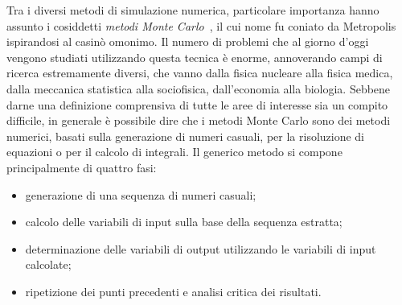 Tra i diversi metodi di simulazione numerica, particolare importanza hanno assunto i cosiddetti \emph{metodi Monte Carlo}~\cite{metropolis:jasa49}, il cui nome fu coniato da Metropolis ispirandosi al casinò omonimo.
%
Il numero di problemi che al giorno d'oggi vengono studiati utilizzando questa tecnica è enorme, annoverando campi di ricerca estremamente diversi, che vanno dalla fisica nucleare alla fisica medica, dalla meccanica statistica alla sociofisica, dall'economia alla biologia.
%
%
%
Sebbene darne una definizione comprensiva di tutte le aree di interesse sia un compito difficile, in generale è possibile dire che i metodi Monte Carlo sono dei metodi numerici, basati sulla generazione di numeri casuali, per la risoluzione di equazioni o per il calcolo di integrali.
Il generico metodo si compone principalmente di quattro fasi:
\begin{itemize}
	\item generazione di una sequenza di numeri casuali;
	\item calcolo delle variabili di input sulla base della sequenza estratta;
	\item determinazione delle variabili di output utilizzando le variabili di input calcolate;
	\item ripetizione dei punti precedenti e analisi critica dei risultati.
\end{itemize}



